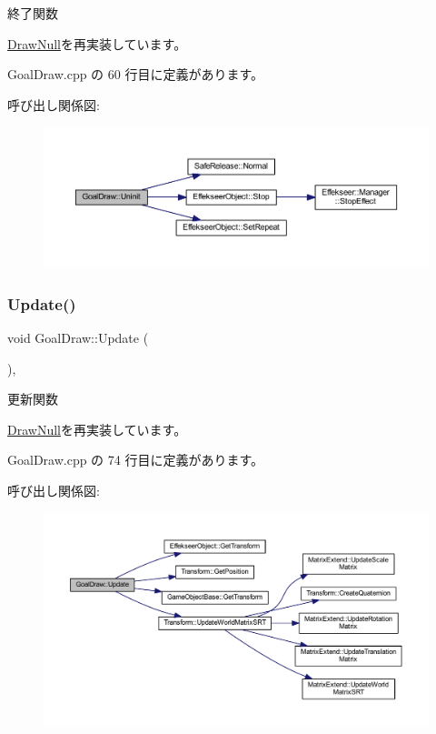 終了関数 



\mbox{\hyperlink{class_draw_null_a12d44e341c7364b5ab9cdd661dc16187}{Draw\+Null}}を再実装しています。



 Goal\+Draw.\+cpp の 60 行目に定義があります。

呼び出し関係図\+:\nopagebreak
\begin{figure}[H]
\begin{center}
\leavevmode
\includegraphics[width=350pt]{class_goal_draw_a01318a0606848a3ca8ca7b7acbf4df24_cgraph}
\end{center}
\end{figure}
\mbox{\label{class_goal_draw_a6e003277ed44eb9c800a616b6acbcb20}} 
\subsubsection{\texorpdfstring{Update()}{Update()}}
{\footnotesize\ttfamily void Goal\+Draw\+::\+Update (\begin{DoxyParamCaption}{ }\end{DoxyParamCaption})\hspace{0.3cm}{\ttfamily [override]}, {\ttfamily [virtual]}}



更新関数 



\mbox{\hyperlink{class_draw_null_a0149bcf84a34b138642ab7975ae46f30}{Draw\+Null}}を再実装しています。



 Goal\+Draw.\+cpp の 74 行目に定義があります。

呼び出し関係図\+:\nopagebreak
\begin{figure}[H]
\begin{center}
\leavevmode
\includegraphics[width=350pt]{class_goal_draw_a6e003277ed44eb9c800a616b6acbcb20_cgraph}
\end{center}
\end{figure}


